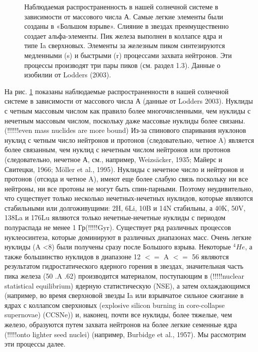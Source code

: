 \documentclass[%
bachelor,    %
natbib,      %
subf,        %
href,        %
colorlinks,  %
]{disser}
\begin{document}
\begin{figure}[h]
	\caption{Наблюдаемая распространенность в нашей солнечной системе в зависимости от массового числа А. Самые легкие элементы были созданы в «Большом взрыве». Слияние в звездах преимущественно создает альфа-элементы. Пик железа выполнен в коллапсе ядра и типе Ia сверхновых. Элементы за железным пиком синтезируются медленными (s) и быстрыми (r) процессами захвата нейтронов. Эти процессы производят три пары пиков (см. раздел 1.3). Данные о изобилии от Lodders (2003).}
	\label{ris:1}
\end{figure}

На рис. \ref{ris:1} показаны наблюдаемые распространенности в нашей солнечной системе в зависимости от массового числа А (данные от Lodders 2003). Нуклиды с четным массовым числом как правило более многочисленными, чем нуклиды с нечетным массовым числом, поскольку даже массовые нуклиды более связаны. (!!!!!!even mass nuclides are more bound) Из-за спинового спаривания нуклонов нуклид с четным число нейтронов и протонов (следовательно, четное A) является более связанным, чем нуклид с нечетным числом нейтронов или протонов (следовательно, нечетное А, см., например, Weizsäcker, 1935; Майерс и Свитецки, 1966; Möller et al., 1995). Нуклиды с нечетное число и нейтронов и протонов (отсюда и четное A), имеют еще более слабую связь поскольку ни все нейтроны, ни все протоны не могут быть спин-парными. Поэтому неудивительно, что существует только несколько нечетных-нечетных нуклидов, которые являются стабильными или долгоживущими: 2H, 6Li, 10B и 14N стабильны, а 40K, 50V, 138La и 176Lu являются только нечетные-нечетные нуклиды с периодом полураспада не менее 1 Гр(!!!!!Gyr). Существует ряд различных процессов нуклеосинтеза, которые доминируют в различных диапазонах масс. Очень легкие нуклиды (A <8) были получены сразу после Большого взрыва. Некоторые $^4He$, а также большинство нуклидов в диапазоне 12 $<=$ A $<=$ 56 являются результатом гидростатического ядерного горения в звездах, значительная часть пика железа (50 .A .62) производится материалом, поступающим в (!!!!!nuclear statistical equilibrium) ядерную статистическую (NSE), а затем охлаждающимся (например, во время сверхновой звезды Ia или взрывчатое сильное сжигание в ядрах с коллапсом сверхновых (explosive silicon burning in core-collapse supernovae) (CCSNe)) и, наконец, почти все нуклиды, более тяжелые, чем железо, образуются путем захвата нейтронов на более легкие семенные ядра (!!!!!onto lighter seed nuclei) (например, Burbidge et al., 1957). Мы рассмотрим эти процессы далее.
\end{document}
